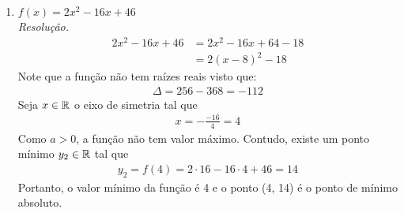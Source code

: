 \begin{enumerate}
    \item $f(x) = 2x^2 - 16x + 46$ \\
    \emph{Resolução.}
    \begin{align*}
        2x^2 - 16x + 46 &= 2x^2 - 16x + 64 - 18 \\ 
        &= 2(x-8)^2 - 18
    \end{align*}
    Note que a função não tem raízes reais visto que:
    \begin{align*}
        \Delta = 256 - 368 = -112
    \end{align*}
    Seja $x \in \mathbb R$ o eixo de simetria tal que
    \begin{align*}
        x = -\frac{-16}{4} = 4
    \end{align*}
    Como $a > 0$, a função não tem valor máximo. Contudo, existe um ponto mínimo $y_2 \in \mathbb R$ tal que
    \begin{align*}
        y_2 = f(4) = 2 \cdot 16 - 16 \cdot 4 + 46 = 14 
    \end{align*}
    Portanto, o valor mínimo da função é 4 e o ponto (4, 14) é o ponto de mínimo absoluto.
\end{enumerate}